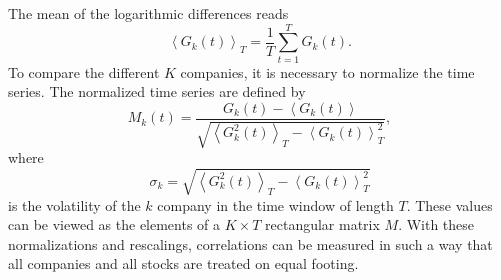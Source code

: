 The mean of the logarithmic differences reads \cite{exact_distributions_guhr}
\begin{equation}
    \left\langle G_{k} \left( t \right) \right\rangle_{T} = \frac{1}{T}
    \sum_{t = 1}^{T} G_{k} \left( t \right).
\end{equation}
To compare the different $K$ companies, it is necessary to normalize the time
series. The normalized time series are defined by
\cite{non_stationarity_fin_guhr,exact_distributions_guhr}
\begin{equation}
    M_{k} \left( t \right) = \frac{G_{k} \left( t \right) - \left\langle
    G_{k} \left( t \right) \right\rangle} {\sqrt{\left\langle G_{k}^{2}
    \left( t \right) \right\rangle_{T} - \left\langle G_{k} \left( t \right)
    \right\rangle^2_{T}}},
\end{equation}
where
\begin{equation}
    \sigma_{k} = \sqrt{\left\langle G_{k}^{2}
    \left( t \right) \right\rangle_{T} - \left\langle G_{k} \left( t \right)
    \right\rangle^2_{T}}
\end{equation}
is the volatility of the $k$ company in the time window of length $T$. These
values can be viewed as the elements of a $K \times T$ rectangular matrix $M$.
With these normalizations and rescalings, correlations can be measured in such
a way that all companies and all stocks are treated on equal footing.

